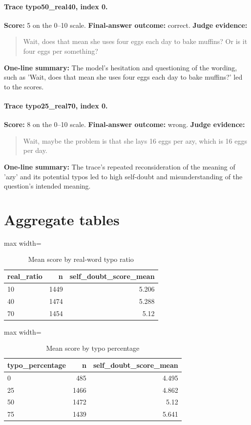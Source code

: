 \documentclass[11pt]{article}
\begin{document}
\paragraph{Trace typo50\_real40, index 0.}
\textbf{Score:} 5 on the 0--10 scale. \textbf{Final-answer outcome:} correct.
\textbf{Judge evidence:} \begin{quote}Wait, does that mean she uses four eggs each day to bake muffins? Or is it four eggs per something?\end{quote}
\textbf{One-line summary:} The model's hesitation and questioning of the wording, such as 'Wait, does that mean she uses four eggs each day to bake muffins?' led to the scores.\medskip
\paragraph{Trace typo25\_real70, index 0.}
\textbf{Score:} 8 on the 0--10 scale. \textbf{Final-answer outcome:} wrong.
\textbf{Judge evidence:} \begin{quote}Wait, maybe the problem is that she lays 16 eggs per azy, which is 16 eggs per day.\end{quote}
\textbf{One-line summary:} The trace's repeated reconsideration of the meaning of 'azy' and its potential typos led to high self-doubt and misunderstanding of the question's intended meaning.\medskip

\section*{Aggregate tables}

\begin{table}[H]
\centering
\caption{Mean score by real-word typo ratio}
\small
\begin{adjustbox}{max width=\textwidth}
\begin{tabular}{lrr}
\toprule
\textbf{real\_ratio} & \textbf{n} & \textbf{self\_doubt\_score\_mean} \\
\midrule
10 & 1449 & 5.206 \\
40 & 1474 & 5.288 \\
70 & 1454 & 5.12 \\
\bottomrule
\end{tabular}
\end{adjustbox}
\end{table}

\begin{table}[H]
\centering
\caption{Mean score by typo percentage}
\small
\begin{adjustbox}{max width=\textwidth}
\begin{tabular}{lrr}
\toprule
\textbf{typo\_percentage} & \textbf{n} & \textbf{self\_doubt\_score\_mean} \\
\midrule
0 & 485 & 4.495 \\
25 & 1466 & 4.862 \\
50 & 1472 & 5.12 \\
75 & 1439 & 5.641 \\
\bottomrule
\end{tabular}
\end{adjustbox}
\end{table}
\end{document}
